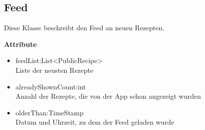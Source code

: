 

\subsection{Feed}
Diese Klasse beschreibt den Feed an neuen Rezepten.

\textbf{Attribute}
\begin{itemize}[nosep]
	\item feedList:List<PublicRecipe> \\ Liste der neusten Rezepte
	\item alreadyShownCount:int \\ Anzahl der Rezepte, die von der App schon angezeigt wurden
	\item olderThan:TimeStamp \\ Datum und Uhrzeit, zu dem der Feed geladen wurde
\end{itemize}

